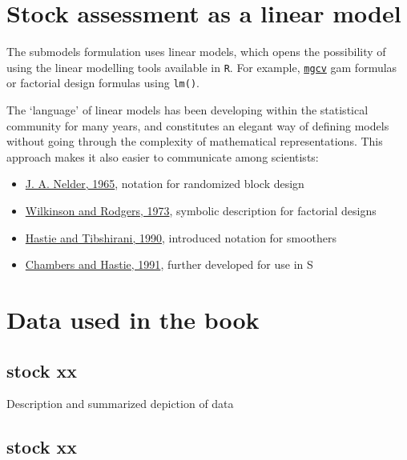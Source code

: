 \documentclass[
]{book}
\providecommand{\tightlist}{%
  \setlength{\itemsep}{0pt}\setlength{\parskip}{0pt}}
\begin{document}
\hypertarget{stock-assessment-as-a-linear-model}{%
\section{Stock assessment as a linear model}\label{stock-assessment-as-a-linear-model}}

The submodels formulation uses linear models, which opens the possibility of using the linear modelling tools available in \texttt{R}. For example, \href{http://cran.r-project.org/web/packages/mgcv/index.html}{\texttt{mgcv}} gam formulas or factorial design formulas using \texttt{lm()}.

The `language' of linear models has been developing within the statistical community for many years, and constitutes an elegant way of defining models without going through the complexity of mathematical representations. This approach makes it also easier to communicate among scientists:

\begin{itemize}
\tightlist
\item
  \href{http://rspa.royalsocietypublishing.org/content/283/1393/147.short}{J. A. Nelder, 1965}, notation for randomized block design
\item
  \href{http://www.jstor.org/stable/info/2346786}{Wilkinson and Rodgers, 1973}, symbolic description for factorial designs
\item
  \href{http://books.google.com/books?isbn=0412343908}{Hastie and Tibshirani, 1990}, introduced notation for smoothers
\item
  \href{http://books.google.com/books?isbn=041283040X}{Chambers and Hastie, 1991}, further developed for use in S
\end{itemize}

\hypertarget{data-used-in-the-book}{%
\section{Data used in the book}\label{data-used-in-the-book}}

\hypertarget{stock-xx}{%
\subsection{stock xx}\label{stock-xx}}

Description and summarized depiction of data

\hypertarget{stock-xx-1}{%
\subsection{stock xx}\label{stock-xx-1}}
\end{document}
